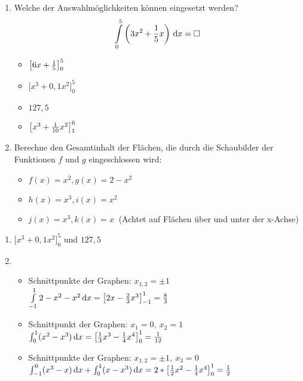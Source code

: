 \begin{enumerate}
	\item Welche der Auswahlmöglichkeiten können eingesetzt werden?
	\begin{equation*}
		\int\limits_0^5 \left(3x^2+ \frac 1 5 x\right)  \,\mathrm{d} x = \Box
	\end{equation*}
  \begin{multicols}{4}
    \begin{itemize}
      \item $\left[ 6x + \frac{1}{5} \right]_0^5$
      \item $\bigg[x^3 + 0,1 x^2\bigg]_0^5$
  		\item $127,5$
      \item $\left[ x^3 + \frac{1}{10} x^2 \right]_1^6$
  	\end{itemize}
  \end{multicols}
  \item Berechne den Gesamtinhalt der Flächen, die durch die Schaubilder der Funktionen $f$ und $g$ eingeschlossen wird:
  \begin{itemize}
    \item $f(x)=x^2, g(x)=2-x^2$
    \item $h(x)=x^3, i(x)=x^2$
    \item $j(x)=x^3, k(x)=x\ $ (Achtet auf Flächen über und unter der x-Achse)
  \end{itemize}
\end{enumerate}
\begin{lsg}{}
  \begin{enumerate}
    \item $\bigg[x^3 + 0,1 x^2\bigg]_0^5$ und $127,5$
    \item
    \begin{itemize}
      \item Schnittpunkte der Graphen: $x_{1,2}=\pm 1$\\ $\int\limits_{-1}^1 2-x^2-x^2\,\mathrm{d} x=\left[2x-\frac{2}{3}x^3\right]_{-1}^1=\frac 8 3$
      \item Schnittpunkt der Graphen: $x_1=0,\ x_2=1$ \\$\int_0^1 (x^2-x^3)\,\mathrm{d} x=\left[\frac{1}{3}x^3-\frac{1}{4}x^4\right]_0^1=\frac 1 {12}$
      \item Schnittpunkte der Graphen: $x_{1,2}=\pm 1,\ x_3=0$ \\$\int_{-1}^0 (x^3-x)\,\mathrm{d} x+\int_0^1 (x-x^3)\,\mathrm{d} x=2*\left[\frac{1}{2}x^2-\frac{1}{4}x^4\right]_0^1=\frac 1 2$
    \end{itemize}
  \end{enumerate}
\end{lsg}


